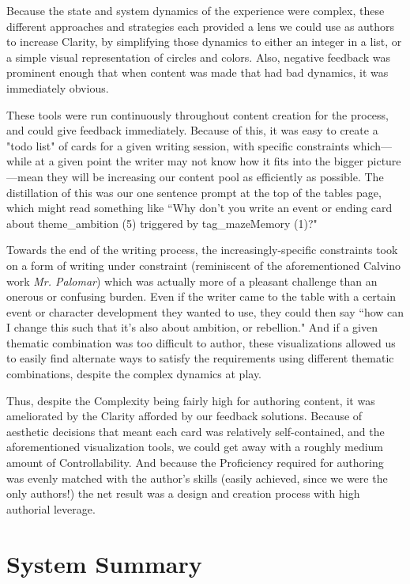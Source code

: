 Because the state and system dynamics of the experience were complex, these different approaches and strategies each provided a lens we could use as authors to increase Clarity, by simplifying those dynamics to either an integer in a list, or a simple visual representation of circles and colors. Also, negative feedback was prominent enough that when content was made that had bad dynamics, it was immediately obvious.

These tools were run continuously throughout content creation for the process, and could give feedback immediately. Because of this, it was easy to create a "todo list" of cards for a given writing session, with specific constraints which---while at a given point the writer may not know how it fits into the bigger picture---mean they will be increasing our content pool as efficiently as possible. The distillation of this was our one sentence prompt at the top of the tables page, which might read something like ``Why don't you write an event or ending card about theme\_ambition (5) triggered by tag\_mazeMemory (1)?"

Towards the end of the writing process, the increasingly-specific constraints took on a form of writing under constraint (reminiscent of the aforementioned Calvino work \textit{Mr. Palomar}) which was actually more of a pleasant challenge than an onerous or confusing burden. Even if the writer came to the table with a certain event or character development they wanted to use, they could then say ``how can I change this such that it's also about ambition, or rebellion." And if a given thematic combination was too difficult to author, these visualizations allowed us to easily find alternate ways to satisfy the requirements using different thematic combinations, despite the complex dynamics at play.

Thus, despite the Complexity being fairly high for authoring content, it was ameliorated by the Clarity afforded by our feedback solutions. Because of aesthetic decisions that meant each card was relatively self-contained, and the aforementioned visualization tools, we could get away with a roughly medium amount of Controllability. And because the Proficiency required for authoring was evenly matched with the author's skills (easily achieved, since we were the only authors!) the net result was a design and creation process with high authorial leverage.

\section{System Summary}\label{sec:icebound-system-summary}

